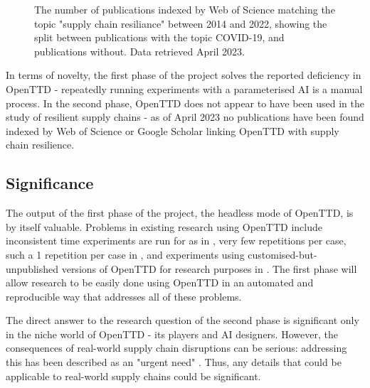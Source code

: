\documentclass[a4paper,11pt]{article}
\begin{document}
\begin{figure}[h]
\centering
{}
\caption{The number of publications indexed by Web of Science matching the topic "supply chain resiliance" between 2014 and 2022, showing the split between publications with the topic COVID-19, and publications without. Data retrieved April 2023.}
\label{fig:supplychainresiliance}
\end{figure}

In terms of novelty, the first phase of the project solves the reported \cite{openttdNoHeadless} deficiency in OpenTTD - repeatedly running experiments with a parameterised AI is a manual process. In the second phase, OpenTTD does not appear to have been used in the study of resilient supply chains - as of April 2023 no publications have been found indexed by Web of Science or Google Scholar linking OpenTTD with supply chain resilience.

\subsection{Significance}

The output of the first phase of the project, the headless mode of OpenTTD, is by itself valuable. Problems in existing research using OpenTTD include inconsistent time experiments are run for as in \cite{rios_trains_2009}, very few repetitions per case, such a 1 repetition per case in \cite{wisniewski_artificial}, and experiments using customised-but-unpublished versions of OpenTTD for research purposes in \cite{shen_rtsenv_2011, konijnendijk2015mcts}. The first phase will allow research to be easily done using OpenTTD in an automated and reproducible way that addresses all of these problems. 

The direct answer to the research question of the second phase is significant only in the  niche world of OpenTTD - its players and AI designers. However, the consequences of real-world supply chain disruptions can be serious: addressing this has been described as an "urgent need" \cite{moosavi_supply_2022}. Thus, any details that could be applicable to real-world supply chains could be significant.
\end{document}
